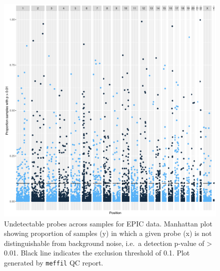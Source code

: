 \documentclass[
]{book}
\begin{document}
\begin{figure}

{\centering \includegraphics[width=0.8\linewidth]{figs/SWSqcEPICpropSamples} 

}

\caption{Undetectable probes across samples for EPIC data. Manhattan plot showing proportion of samples (y) in which a given probe (x) is not distinguishable from background noise, i.e.~a detection p-value of \textgreater{} 0.01. Black line indicates the exclusion threshold of 0.1. Plot generated by \texttt{meffil} QC report.}\label{fig:SWSqcEPICpropSamples}
\end{figure}
\end{document}
